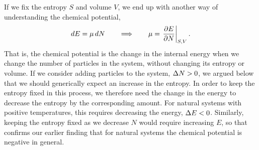 If we fix the entropy $S$ and volume $V$, we end up with another way of understanding the chemical potential,
\begin{equation}
  \label{eq:mu_E}
  \mathop{dE} = \mu \mathop{dN} \qquad \Longrightarrow \qquad \mu = \left.\frac{\partial E}{\partial N}\right|_{S, V}.
\end{equation}
That is, the chemical potential is the change in the internal energy when we change the number of particles in the system, without changing its entropy or volume.
If we consider adding particles to the system, $\Delta N > 0$, we argued below  that we should generically expect an increase in the entropy.
In order to keep the entropy fixed in this process, we therefore need the change in the energy to decrease the entropy by the corresponding amount.
For natural systems with positive temperatures, this requires decreasing the energy, $\Delta E < 0$.
Similarly, keeping the entropy fixed as we decrease $N$ would require increasing $E$, so that  confirms our earlier finding that for natural systems the chemical potential is negative in general.
